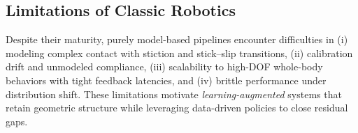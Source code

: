 \subsection{Limitations of Classic Robotics}
Despite their maturity, purely model-based pipelines encounter difficulties in (i) modeling complex contact with stiction and stick–slip transitions, (ii) calibration drift and unmodeled compliance, (iii) scalability to high-DOF whole-body behaviors with tight feedback latencies, and (iv) brittle performance under distribution shift. These limitations motivate \emph{learning-augmented} systems that retain geometric structure while leveraging data-driven policies to close residual gaps.